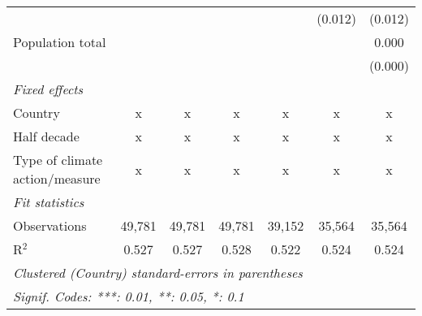 \begin{tabular}{lcccccc}
                                                                              &                &                &                &               & (0.012)       & (0.012)\\   
   Population total                                                           &                &                &                &               &               & 0.000\\   
                                                                              &                &                &                &               &               & (0.000)\\   
   \emph{Fixed effects}\\
   Country                                                                    & x              & x              & x              & x             & x             & x\\  
   Half decade                                                                & x              & x              & x              & x             & x             & x\\  
   Type of climate action/measure                                             & x              & x              & x              & x             & x             & x\\  
   \midrule \emph{Fit statistics}\\
   Observations                                                               & 49,781         & 49,781         & 49,781         & 39,152        & 35,564        & 35,564\\  
   R$^2$                                                                      & 0.527          & 0.527          & 0.528          & 0.522         & 0.524         & 0.524\\  
   \midrule
   \multicolumn{7}{l}{\emph{Clustered (Country) standard-errors in parentheses}}\\
   \multicolumn{7}{l}{\emph{Signif. Codes: ***: 0.01, **: 0.05, *: 0.1}}\\
\end{tabular}
\par\endgroup


